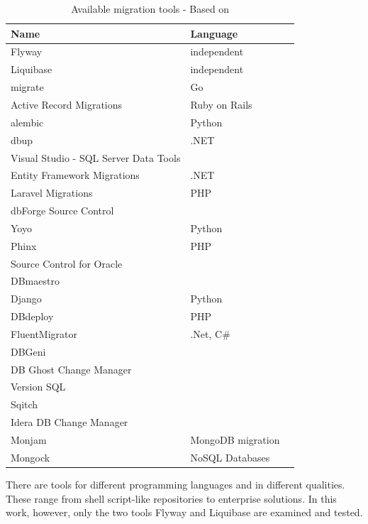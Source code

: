 \begin{table}[H]
	\centering
	\begin{tabularx}{10cm}{X l l}
		\toprule
		Name & Language \\ 
		\midrule
		Flyway & independent \\
		Liquibase & independent \\
		migrate & Go  \\
		Active Record Migrations & Ruby on Rails \\
		alembic & Python \\
		dbup & .NET \\
		Visual Studio - SQL Server Data Tools & \\
		Entity Framework Migrations & .NET \\
		Laravel Migrations & PHP \\
		dbForge Source Control & \\
		Yoyo &  Python\\
		Phinx & PHP\\
		Source Control for Oracle & \\
		DBmaestro &  \\
		Django & Python \\
		DBdeploy & PHP \\
		FluentMigrator & .Net, C\#\\
		DBGeni & \\
		DB Ghost Change Manager & \\
		Version SQL & \\
		Sqitch & \\
		Idera DB Change Manager & \\
		Monjam & MongoDB migration\\
		Mongock & NoSQL Databases\\
	\bottomrule
	\end{tabularx}
	\caption{Available migration tools - Based on \cite{GoogleCloudTools, DBMSTools}}
	\label{tab:migration_tools}
\end{table}

There are tools for different programming languages and in different qualities. These range from shell script-like repositories to enterprise solutions. In this work, however, only the two tools Flyway and Liquibase are examined and tested.






